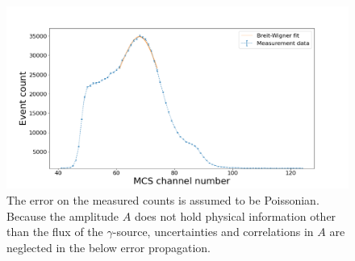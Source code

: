 \begin{figure}
	\centering
	\includegraphics[width=1.0\textwidth]{./fig/calibration.png}
	\caption{The error on the measured counts is assumed to be Poissonian.
	Because the amplitude $A$ does not hold physical information other than the 
	flux of the $\gamma$-source, uncertainties and correlations in $A$ are
	neglected in the below error propagation.}
	\label{fig:ecal}
\end{figure}

\newpage
